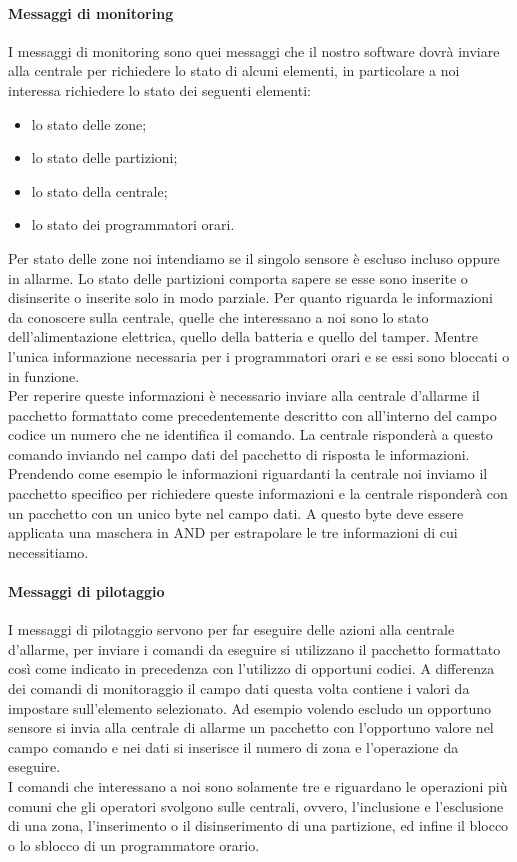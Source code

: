 \paragraph{Messaggi di monitoring}
I messaggi di monitoring sono quei messaggi che il nostro software dovrà inviare alla centrale per richiedere lo stato di alcuni elementi, in particolare a noi interessa richiedere lo stato dei seguenti elementi:
\begin{itemize}
	\item lo stato delle zone;
	\item lo stato delle partizioni;
	\item lo stato della centrale;
	\item lo stato dei programmatori orari.
\end{itemize}
Per stato delle zone noi intendiamo se il singolo sensore è escluso incluso oppure in allarme. Lo stato delle partizioni comporta sapere se esse sono inserite o disinserite o inserite solo in modo parziale. Per quanto riguarda le informazioni da conoscere sulla centrale, quelle che interessano a noi sono lo stato dell'alimentazione elettrica, quello della batteria e quello del tamper. Mentre l'unica informazione necessaria per i programmatori orari e se essi sono bloccati o in funzione.\\
Per reperire queste informazioni è necessario inviare alla centrale d'allarme il pacchetto formattato come precedentemente descritto con all'interno del campo codice un numero che ne identifica il comando. La centrale risponderà a questo comando inviando nel campo dati del pacchetto di risposta le informazioni. Prendendo come esempio le informazioni riguardanti la centrale noi inviamo il pacchetto specifico per richiedere queste informazioni e la centrale risponderà con un pacchetto con un unico byte nel campo dati. A questo byte deve essere applicata una maschera in AND per estrapolare le tre informazioni di cui necessitiamo.
\paragraph{Messaggi di pilotaggio}
I messaggi di pilotaggio servono per far eseguire delle azioni alla centrale d'allarme, per inviare i comandi da eseguire si utilizzano il pacchetto formattato così come indicato in precedenza con l'utilizzo di  opportuni codici. A differenza dei comandi di monitoraggio il campo dati questa volta contiene i valori da impostare sull'elemento selezionato. Ad esempio volendo escludo un opportuno sensore si invia alla centrale di allarme un pacchetto con l'opportuno valore nel campo comando e nei dati si inserisce il numero di zona e l'operazione da eseguire.\\
I comandi che interessano a noi sono solamente tre e riguardano le operazioni più comuni che gli operatori svolgono sulle centrali, ovvero, l'inclusione e l'esclusione di una zona, l'inserimento o il disinserimento di una partizione, ed infine il blocco o lo sblocco di un programmatore orario.
